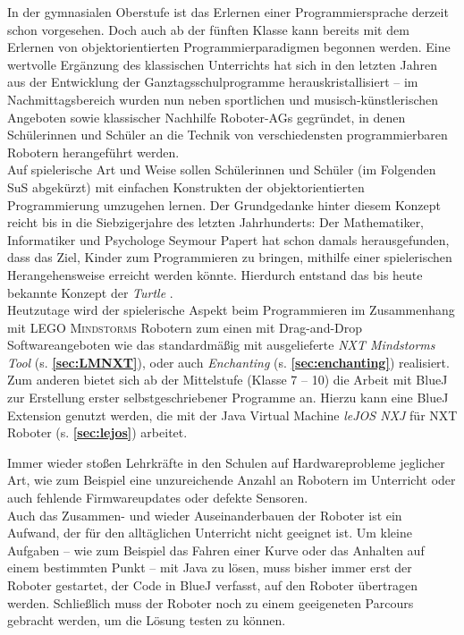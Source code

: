 \documentclass[paper=a4, pagesize, DIV=calc, BCOR=15.5mm, twoside=on, onecolumn=on, open = right, titlepage =on, parskip =half-, headsepline = on, footsepline = on, chapterprefix = on, appendixprefix = off, fontsize = 12pt, numbers = noenddot, abstract = on]{scrbook}
\numberwithin{equation}{chapter}
\theoremstyle{definition}
\theoremstyle{plain}
\theoremstyle{plain}
\theoremstyle{remark}
\theoremstyle{plain}
\theoremstyle{plain}
\begin{document}
In der gymnasialen Oberstufe ist das Erlernen einer Programmiersprache derzeit schon vorgesehen. Doch auch ab der fünften Klasse kann bereits mit dem Erlernen von objektorientierten Programmierparadigmen begonnen werden. Eine wertvolle Ergänzung des klassischen Unterrichts hat sich in den letzten Jahren aus der Entwicklung der Ganztagsschulprogramme herauskristallisiert -- im Nachmittagsbereich wurden nun neben sportlichen und musisch-künstlerischen Angeboten sowie klassischer Nachhilfe Roboter-AGs gegründet, in denen Schülerinnen und Schüler an die Technik von verschiedensten programmierbaren Robotern herangeführt werden.\\
Auf spielerische Art und Weise sollen Schülerinnen und Schüler (im Folgenden SuS abgekürzt) mit einfachen Konstrukten der objektorientierten Programmierung umzugehen lernen. Der Grundgedanke hinter diesem Konzept reicht bis in die Siebzigerjahre des letzten Jahrhunderts: Der Mathematiker, Informatiker und Psychologe Seymour Papert hat schon damals herausgefunden, dass das Ziel, Kinder zum Programmieren zu bringen, mithilfe einer spielerischen Herangehensweise erreicht werden könnte. Hierdurch entstand das bis heute bekannte Konzept der \emph{Turtle} \cite[S.365]{nievergelt:99}.\\
Heutzutage wird der spielerische Aspekt beim Programmieren im Zusammenhang mit \textsc{LEGO Mindstorms} Robotern zum einen mit Drag-and-Drop Softwareangeboten wie das standardmäßig mit ausgelieferte \emph{NXT Mindstorms Tool} (s.  \textbf{\ref{sec:LMNXT}}), oder auch \emph{Enchanting} (s. \textbf{\ref{sec:enchanting}}) realisiert. Zum anderen bietet sich ab der Mittelstufe (Klasse 7 -- 10) die Arbeit mit BlueJ zur Erstellung erster selbstgeschriebener Programme an. Hierzu kann eine BlueJ Extension genutzt werden, die mit der Java Virtual Machine \emph{leJOS NXJ} für NXT Roboter (s. \textbf{\ref{sec:lejos}}) arbeitet.

Immer wieder stoßen Lehrkräfte in den Schulen auf Hardwareprobleme jeglicher Art, wie zum Beispiel eine unzureichende Anzahl an Robotern im Unterricht oder auch fehlende Firmwareupdates oder defekte Sensoren.\\
Auch das Zusammen- und wieder Auseinanderbauen der Roboter ist ein Aufwand, der für den alltäglichen Unterricht nicht geeignet ist. Um kleine Aufgaben -- wie zum Beispiel das Fahren einer Kurve oder das Anhalten auf einem bestimmten Punkt -- mit Java zu lösen, muss bisher immer erst der Roboter gestartet, der Code in BlueJ verfasst, auf den Roboter übertragen werden. Schließlich muss der Roboter noch zu einem geeigeneten Parcours gebracht werden, um die Lösung testen zu können.
\end{document}
